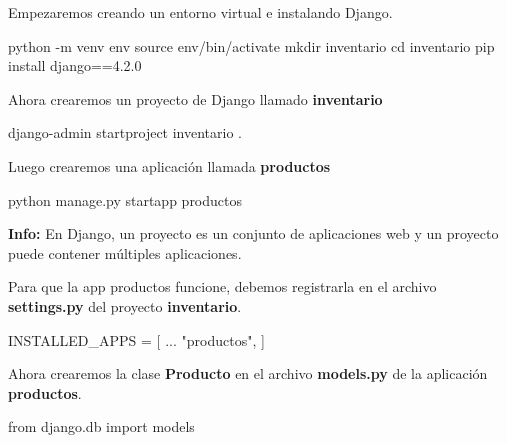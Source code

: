 \documentclass[
  a4paper,
  DIV=11,
  numbers=noendperiod,
  onepage,
  openany]{scrreprt}
\newenvironment{Shaded}{\begin{snugshade}}{\end{snugshade}}
\newcommand{\AttributeTok}[1]{\textcolor[rgb]{0.40,0.45,0.13}{#1}}
\newcommand{\BuiltInTok}[1]{\textcolor[rgb]{0.00,0.23,0.31}{#1}}
\newcommand{\ExtensionTok}[1]{\textcolor[rgb]{0.00,0.23,0.31}{#1}}
\newcommand{\FunctionTok}[1]{\textcolor[rgb]{0.28,0.35,0.67}{#1}}
\newcommand{\ImportTok}[1]{\textcolor[rgb]{0.00,0.46,0.62}{#1}}
\newcommand{\NormalTok}[1]{\textcolor[rgb]{0.00,0.23,0.31}{#1}}
\newcommand{\OperatorTok}[1]{\textcolor[rgb]{0.37,0.37,0.37}{#1}}
\newcommand{\StringTok}[1]{\textcolor[rgb]{0.13,0.47,0.30}{#1}}
\begin{document}
\begin{tcolorbox}
Empezaremos creando un entorno virtual e instalando Django.

\begin{Shaded}
\begin{Highlighting}[]
\ExtensionTok{python} \AttributeTok{{-}m}\NormalTok{ venv env}
\BuiltInTok{source}\NormalTok{ env/bin/activate}
\FunctionTok{mkdir}\NormalTok{ inventario}
\BuiltInTok{cd}\NormalTok{ inventario}
\ExtensionTok{pip}\NormalTok{ install django==4.2.0}
\end{Highlighting}
\end{Shaded}

Ahora crearemos un proyecto de Django llamado \textbf{inventario}

\begin{Shaded}
\begin{Highlighting}[]
\ExtensionTok{django{-}admin}\NormalTok{ startproject inventario .}
\end{Highlighting}
\end{Shaded}

Luego crearemos una aplicación llamada \textbf{productos}

\begin{Shaded}
\begin{Highlighting}[]
\ExtensionTok{python}\NormalTok{ manage.py startapp productos}
\end{Highlighting}
\end{Shaded}

\textbf{Info:} En Django, un proyecto es un conjunto de aplicaciones web
y un proyecto puede contener múltiples aplicaciones.

Para que la app productos funcione, debemos registrarla en el archivo
\textbf{settings.py} del proyecto \textbf{inventario}.

\begin{Shaded}
\begin{Highlighting}[]
\NormalTok{INSTALLED\_APPS }\OperatorTok{=}\NormalTok{ [}
\NormalTok{    ...}
    \StringTok{"productos"}\NormalTok{,}
\NormalTok{]}
\end{Highlighting}
\end{Shaded}

Ahora crearemos la clase \textbf{Producto} en el archivo
\textbf{models.py} de la aplicación \textbf{productos}.

\begin{Shaded}
\begin{Highlighting}[]
\ImportTok{from}\NormalTok{ django.db }\ImportTok{import}\NormalTok{ models}


\end{Highlighting}
\end{Shaded}
\end{tcolorbox}
\end{document}
